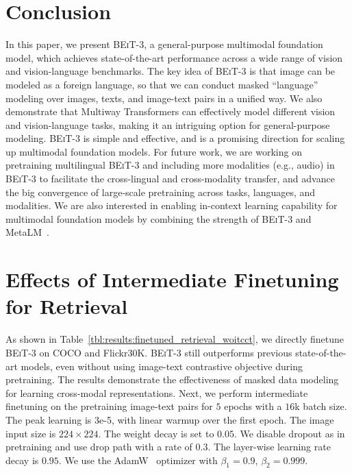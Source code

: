 \documentclass{article}
\newcommand\our{\textsc{BEiT-3}}
\newcommand\multiway{Multiway Transformers}
\begin{document}
\section{Conclusion}

In this paper, we present \our{}, a general-purpose multimodal foundation model, which achieves state-of-the-art performance across a wide range of vision and vision-language benchmarks.
The key idea of \our{} is that image can be modeled as a foreign language, so that we can conduct masked ``language'' modeling over images, texts, and image-text pairs in a unified way.
We also demonstrate that \multiway{} can effectively model different vision and vision-language tasks, making it an intriguing option for general-purpose modeling.
\our{} is simple and effective, and is a promising direction for scaling up multimodal foundation models.
For future work, we are working on pretraining multilingual \our{} and including more modalities (e.g., audio) in \our{} to facilitate the cross-lingual and cross-modality transfer, and advance the big convergence of large-scale pretraining across tasks, languages, and modalities.
We are also interested in enabling in-context learning capability for multimodal foundation models by combining the strength of \our{} and MetaLM~\cite{metalm}.

\newpage





\newpage
\appendix


\section{Effects of Intermediate Finetuning for Retrieval}

As shown in Table~\ref{tbl:results:finetuned_retrieval_woitcct}, we directly finetune \our{} on COCO and Flickr30K.
\our{} still outperforms previous state-of-the-art models, even without using image-text contrastive objective during pretraining.
The results demonstrate the effectiveness of masked data modeling for learning cross-modal representations.
Next, we perform intermediate finetuning on the pretraining image-text pairs for $5$ epochs with a $16$k batch size.
The peak learning is 3e-5, with linear warmup over the first epoch.
The image input size is $224 \times 224$.
The weight decay is set to $0.05$.
We disable dropout as in pretraining and use drop path with a rate of $0.3$.
The layer-wise learning rate decay is $0.95$.
We use the AdamW~\citep{adamw} optimizer with $\beta_1=0.9$, $\beta_2=0.999$.
\end{document}
